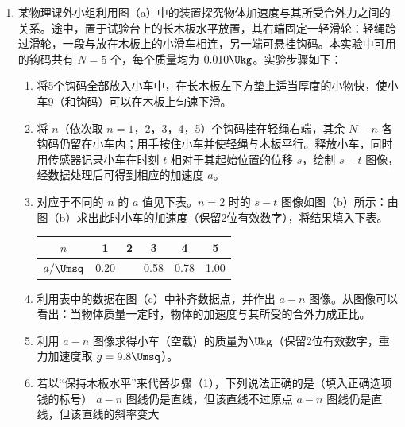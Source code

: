 \documentclass[\gkver]{gaokaozhenti}
\begin{document}
\begin{enumerate}
\item
某物理课外小组利用图（a）中的装置探究物体加速度与其所受合外力之间的关系。途中，置于试验台上的长木板水平放置，其右端固定一轻滑轮：轻绳跨过滑轮，一段与放在木板上的小滑车相连，另一端可悬挂钩码。本实验中可用的钩码共有 $N=5$ 个，每个质量均为 $0.010\Ukg$。实验步骤如下：
\begin{enumerate}
	\item
	将5个钩码全部放入小车中，在长木板左下方垫上适当厚度的小物快，使小车9（和钩码）可以在木板上匀速下滑。
	\item
	将 $n$（依次取 $n=1$，2，3，4，5）个钩码挂在轻绳右端，其余 $N-n$ 各钩码仍留在小车内；用手按住小车并使轻绳与木板平行。释放小车，同时用传感器记录小车在时刻 $t$ 相对于其起始位置的位移 $s$，绘制 $s-t$ 图像，经数据处理后可得到相应的加速度 $a$。
	\item
	对应于不同的 $n$ 的 $a$ 值见下表。$n=2$ 时的 $s-t$ 图像如图（b）所示：由图（b）求出此时小车的加速度（保留2位有效数字），将结果填入下表。
	\begin{center}
	\begin{tabular}{|c|c|c|c|c|c|}
	\hline
	$n$ & 1 & 2 & 3 & 4 & 5 \\
	\hline
	$a/\Umsq$ & 0.20 &  & 0.58 & 0.78 & 1.00 \\
	\hline
	\end{tabular}
	\end{center}
	\item
	利用表中的数据在图（c）中补齐数据点，并作出 $a-n$ 图像。从图像可以看出：当物体质量一定时，物体的加速度与其所受的合外力成正比。
	\item
	利用 $a-n$ 图像求得小车（空载）的质量为$\Ukg$（保留2位有效数字，重力加速度取 $g=9.8\Umsq$）。
	\item
	若以“保持木板水平”来代替步骤（1），下列说法正确的是（填入正确选项钱的标号）
	{$a-n$ 图线仍是直线，但该直线不过原点}
	{$a-n$ 图线仍是直线，但该直线的斜率变大}
\end{enumerate}



\end{enumerate}
\end{document}
